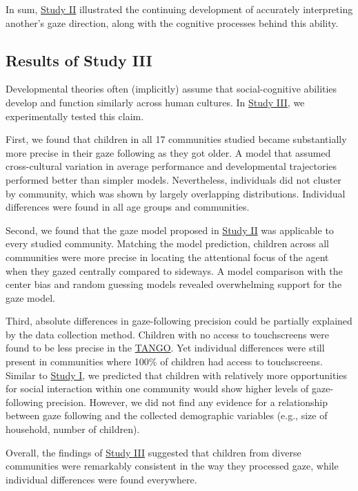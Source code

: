 \documentclass[
]{scrbook}
\begin{document}
In sum, \hyperref[studyII]{Study II} illustrated the continuing development of accurately interpreting another's gaze direction, along with the cognitive processes behind this ability.

\subsection{Results of Study III}\label{results-studyIII}

Developmental theories often (implicitly) assume that social-cognitive abilities develop and function similarly across human cultures. In \hyperref[studyIII]{Study III}, we experimentally tested this claim.

First, we found that children in all 17 communities studied became substantially more precise in their gaze following as they got older. A model that assumed cross-cultural variation in average performance and developmental trajectories performed better than simpler models. Nevertheless, individuals did not cluster by community, which was shown by largely overlapping distributions. Individual differences were found in all age groups and communities.

Second, we found that the gaze model proposed in \hyperref[studyII]{Study II} was applicable to every studied community. Matching the model prediction, children across all communities were more precise in locating the attentional focus of the agent when they gazed centrally compared to sideways. A model comparison with the center bias and random guessing models revealed overwhelming support for the gaze model.

Third, absolute differences in gaze-following precision could be partially explained by the data collection method. Children with no access to touchscreens were found to be less precise in the \hyperref[acronyms_TANGO]{TANGO}. Yet individual differences were still present in communities where 100\% of children had access to touchscreens. Similar to \hyperref[studyI]{Study I}, we predicted that children with relatively more opportunities for social interaction within one community would show higher levels of gaze-following precision. However, we did not find any evidence for a relationship between gaze following and the collected demographic variables (e.g., size of household, number of children).

Overall, the findings of \hyperref[studyIII]{Study III} suggested that children from diverse communities were remarkably consistent in the way they processed gaze, while individual differences were found everywhere.
\end{document}
